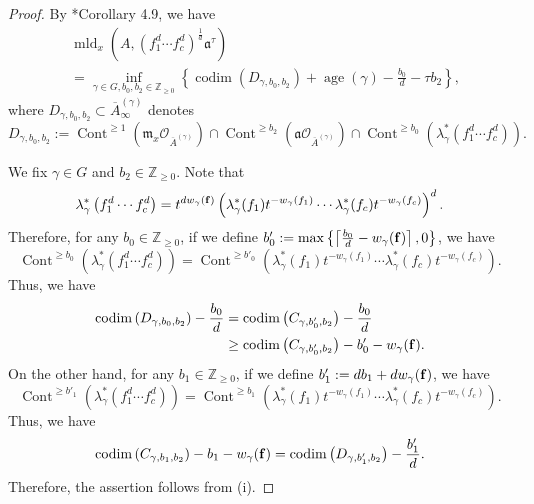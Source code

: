 \documentclass[a4paper,11pt]{amsart}
\theoremstyle{definition}
\theoremstyle{remark}
\begin{document}
\begin{proof}
By \cite{NS22}*{Corollary 4.9}, we have 
\begin{align*}\tag{i}
&\operatorname{mld}_x \left( A, (f_1 ^d \cdots f_c ^d )^{\frac{1}{d}} \mathfrak{a} ^{\tau} \right)\\
&= \inf _{\gamma \in G, b_0, b_2 \in \mathbb{Z}_{\ge 0}}
\left \{ 
\operatorname{codim} 
\left (D_{\gamma, b_0, b_2} \right) + \operatorname{age}(\gamma) -\frac{b_0}{d} - \tau b_2
\right \},
\end{align*}
where $D_{\gamma, b_0, b_2} \subset \overline{A}^{(\gamma)} _{\infty}$ denotes
\[
D_{\gamma, b_0, b_2} := 
\operatorname{Cont}^{\ge 1} \left( \mathfrak{m}_x \mathcal{O}_{\overline{A}^{(\gamma)}} \right) 
\cap
\operatorname{Cont}^{\ge b_2} \left( \mathfrak{a} \mathcal{O}_{\overline{A}^{(\gamma)}} \right) 
\cap
\operatorname{Cont}^{\ge b_0} \left( \lambda^* _{\gamma} \left( f_1 ^d \cdots f_c ^d \right) \right). 
\]

We fix $\gamma \in G$ and $b_2 \in \mathbb{Z}_{\ge 0}$. 
Note that 
\[
\lambda^* _{\gamma} \left( f_1 ^d \cdots f_c ^d \right) = 
t^{d w_{\gamma}({\bf f})} \left( \lambda ^* _{\gamma} (f_1) t^{- w_{\gamma} (f_1)} \cdots \lambda ^* _{\gamma} (f_c) t^{- w_{\gamma} (f_c)} \right)^d. 
\]
Therefore, for any $b_0 \in \mathbb{Z}_{\ge 0}$, if we define $b' _0 := \max \left\{ \left \lceil \frac{b_0}{d} - w_{\gamma}({\bf f}) \right \rceil, 0 \right\}$, we have 
\[
\operatorname{Cont}^{\ge b_0} \left( \lambda^* _{\gamma} \left( f_1 ^d \cdots f_c ^d \right) \right)
= \operatorname{Cont}^{\ge b' _0} \left( \lambda ^* _{\gamma} (f_1) t^{- w_{\gamma} (f_1)} \cdots \lambda ^* _{\gamma} (f_c) t^{- w_{\gamma} (f_c)} \right). 
\]
Thus, we have 
\begin{align*}
\operatorname{codim} \left( D_{\gamma, b_0, b_2} \right) - \frac{b_0}{d} 
&= \operatorname{codim}\left( C_{\gamma, b'_0, b_2} \right) - \frac{b_0}{d} \\
&\ge \operatorname{codim}\left( C_{\gamma, b'_0, b_2} \right) - b'_0 - w_{\gamma}({\bf f}). 
\end{align*}
On the other hand, for any $b_1 \in \mathbb{Z}_{\ge 0}$, 
if we define $b' _1 := d b_1 + d w_{\gamma}({\bf f})$, we have 
\[
\operatorname{Cont}^{\ge b' _1} \left( \lambda^* _{\gamma} \left( f_1 ^d \cdots f_c ^d \right) \right)
= \operatorname{Cont}^{\ge b_1} \left( \lambda ^* _{\gamma} (f_1) t^{- w_{\gamma} (f_1)} \cdots \lambda ^* _{\gamma} (f_c) t^{- w_{\gamma} (f_c)} \right). 
\]
Thus, we have 
\[
\operatorname{codim} \left( C_{\gamma, b_1, b_2} \right) - b_1 - w_{\gamma}({\bf f}) 
= 
\operatorname{codim} \left( D_{\gamma, b'_1, b_2} \right) - \frac{b'_1}{d}. 
\]
Therefore, the assertion follows from (i). 
\end{proof}
\end{document}
